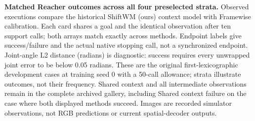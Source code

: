 \textbf{Matched Reacher outcomes across all four preselected strata.} Observed executions compare the historical ShiftWM (ours) context model with Framewise calibration. Each card shares a goal and the identical observation after ten support calls; both arrays match exactly across methods. Endpoint labels give success/failure and the actual native stopping call, not a synchronized endpoint. Joint-angle L2 distance (radians) is diagnostic: success requires every unwrapped joint error to be below 0.05 radians. These are the original first-lexicographic development cases at training seed 0 with a 50-call allowance; strata illustrate outcomes, not their frequency. Shared context and all intermediate observations remain in the complete archived gallery, including Shared context failure on the case where both displayed methods succeed. Images are recorded simulator observations, not RGB predictions or current spatial-decoder outputs.
